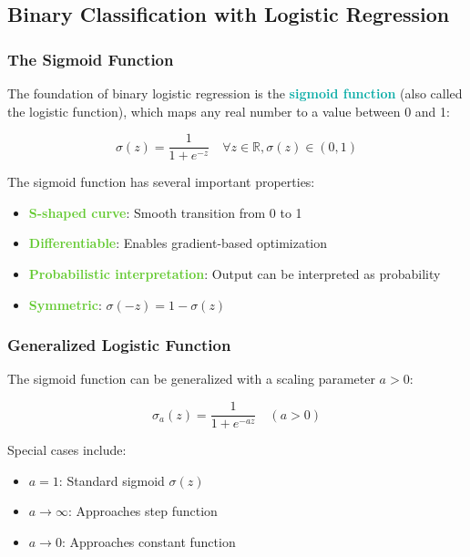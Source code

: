 \documentclass[twoside]{article}
\newcommand{\highlightbluetext}[1]{\textcolor[HTML]{09ACA6}{\textbf{#1}}}
\newcommand{\highlightgreentext}[1]{\textcolor[HTML]{62C92F}{\textbf{#1}}}
\numberwithin{equation}{section}
\begin{document}
	\newpage
	\subsection{Binary Classification with Logistic Regression}
	\label{subsec:BinaryClassificationWithLogisticRegression}

	\subsubsection{The Sigmoid Function}
	\label{subsubsec:TheSigmoidFunction}
	The foundation of binary logistic regression is the \highlightbluetext{sigmoid function} (also called the logistic function), which maps any real number to a value between 0 and 1:

	\begin{equation}
	\label{eq:SigmoidFunction}
		\boxed{\sigma(z) = \frac{1}{1 + e^{-z}} \quad \forall z \in \mathbb{R}, \sigma(z) \in (0,1)}
	\end{equation}

	The sigmoid function has several important properties:
	\begin{itemize}
		\item \highlightgreentext{S-shaped curve}: Smooth transition from 0 to 1
		\item \highlightgreentext{Differentiable}: Enables gradient-based optimization
		\item \highlightgreentext{Probabilistic interpretation}: Output can be interpreted as probability
		\item \highlightgreentext{Symmetric}: $\sigma(-z) = 1 - \sigma(z)$
	\end{itemize}

	\subsubsection{Generalized Logistic Function}
	\label{subsubsec:GeneralizedLogisticFunction}
	The sigmoid function can be generalized with a scaling parameter $a > 0$:

	\begin{equation}
	\label{eq:GeneralizedSigmoid}
		\boxed{\sigma_a(z) = \frac{1}{1 + e^{-az}} \quad (a > 0)}
	\end{equation}

	Special cases include:
	\begin{itemize}
		\item $a = 1$: Standard sigmoid $\sigma(z)$
		\item $a \to \infty$: Approaches step function
		\item $a \to 0$: Approaches constant function
	\end{itemize}
\end{document}
